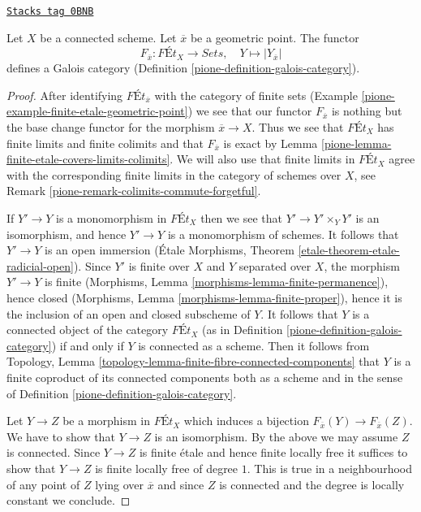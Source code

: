 \begin{lemma}
\label{pione-lemma-finite-etale-connected-galois-category}
\href{https://stacks.math.columbia.edu/tag/0BNB}{\texttt{Stacks tag 0BNB}}

Let $X$ be a connected scheme. Let $\overline{x}$ be a geometric point.
The functor
$$
F_{\overline{x}} : \textit{F\'Et}_X \longrightarrow \textit{Sets},\quad
Y \longmapsto |Y_{\overline{x}}|
$$
defines a Galois category (Definition \ref{pione-definition-galois-category}).
\end{lemma}

\begin{proof}

After identifying $\textit{F\'Et}_{\overline{x}}$ with the category of
finite sets (Example \ref{pione-example-finite-etale-geometric-point})
we see that our functor $F_{\overline{x}}$
is nothing but the base change functor for the morphism $\overline{x} \to X$.
Thus we see that $\textit{F\'Et}_X$ has finite limits and finite colimits
and that $F_{\overline{x}}$ is exact by
Lemma \ref{pione-lemma-finite-etale-covers-limits-colimits}.
We will also use that finite limits in $\textit{F\'Et}_X$
agree with the corresponding finite limits in the category
of schemes over $X$, see Remark \ref{pione-remark-colimits-commute-forgetful}.

\medskip\noindent
If $Y' \to Y$ is a monomorphism in $\textit{F\'Et}_X$
then we see that $Y' \to Y' \times_Y Y'$ is an isomorphism, and
hence $Y' \to Y$ is a monomorphism of schemes. It follows that
$Y' \to Y$ is an open immersion
(\'Etale Morphisms, Theorem \ref{etale-theorem-etale-radicial-open}). Since
$Y'$ is finite over $X$ and $Y$ separated over $X$,
the morphism $Y' \to Y$ is finite
(Morphisms, Lemma \ref{morphisms-lemma-finite-permanence}), hence closed
(Morphisms, Lemma \ref{morphisms-lemma-finite-proper}),
hence it is the inclusion of an open and closed subscheme of $Y$.
It follows that $Y$ is a connected object of the category
$\textit{F\'Et}_X$ (as in Definition \ref{pione-definition-galois-category})
if and only if $Y$ is connected as a scheme. Then it follows from
Topology, Lemma \ref{topology-lemma-finite-fibre-connected-components}
that $Y$ is a finite coproduct of its connected components
both as a scheme and in the sense of
Definition \ref{pione-definition-galois-category}.

\medskip\noindent
Let $Y \to Z$ be a morphism in $\textit{F\'Et}_X$ which induces a
bijection $F_{\overline{x}}(Y) \to F_{\overline{x}}(Z)$. We have to
show that $Y \to Z$ is an isomorphism. By the above we may assume
$Z$ is connected. Since $Y \to Z$ is finite \'etale and hence finite
locally free it suffices to show that $Y \to Z$ is finite locally
free of degree $1$. This is true in a neighbourhood of any point of
$Z$ lying over $\overline{x}$ and since $Z$ is connected and
the degree is locally constant we conclude.
\end{proof}

